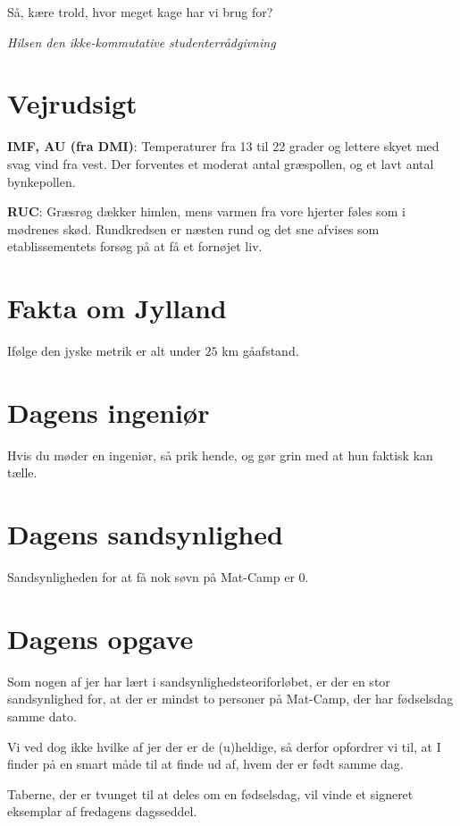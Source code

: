 \begin{minipage}[b]{0.95\linewidth}
\begin{minipage}[t]{0.47\textwidth}
Så, kære trold, hvor meget kage har vi brug for?

{\flushright\emph{Hilsen den ikke-kommutative studenterrådgivning}}

\end{minipage}%
\hfill\begin{minipage}[t]{0.47\textwidth}
\vspace{2mm}
\section*{Vejrudsigt}
\textbf{IMF, AU (fra DMI)}: Temperaturer fra 13 til 22 grader og lettere skyet med svag vind fra vest. Der forventes et moderat antal græspollen, og et lavt antal bynkepollen.

\textbf{RUC}: Græsrøg dækker himlen, mens varmen fra vore hjerter føles som i mødrenes skød. Rundkredsen er næsten rund og det sne afvises som etablissementets forsøg på at få et fornøjet liv.

\section*{Fakta om Jylland}
Ifølge den jyske metrik er alt under $25$ km gåafstand.

\section*{Dagens ingeniør}
Hvis du møder en ingeniør, så prik hende, og gør grin med at hun faktisk kan tælle.

\section*{Dagens sandsynlighed}
Sandsynligheden for at få nok søvn på Mat-Camp er $0$.

\section*{Dagens opgave}
Som nogen af jer har lært i sandsynlighedsteoriforløbet, er der en stor sandsynlighed for, at der er mindst to personer på Mat-Camp, der har fødselsdag samme dato. 

Vi ved dog ikke hvilke af jer der er de (u)heldige, så derfor opfordrer vi til, at I finder på en smart måde til at finde ud af, hvem der er født samme dag. 

Taberne, der er tvunget til at deles om en fødselsdag, vil vinde et signeret eksemplar af fredagens dagsseddel.


\end{minipage}
\end{minipage}
